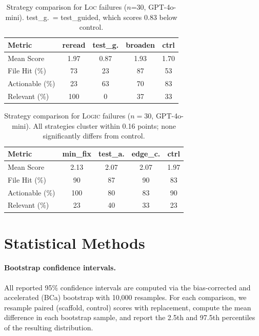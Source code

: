 \documentclass[11pt]{article}
\begin{document}
\begin{table}[t]
\centering
\small
\setlength{\tabcolsep}{3pt}
\begin{tabular}{@{}lcccc@{}}
\toprule
\textbf{Metric} & \textbf{reread} & \textbf{test\_g.} & \textbf{broaden} & \textbf{ctrl} \\
\midrule
Mean Score & 1.97 & 0.87 & 1.93 & 1.70 \\
File Hit (\%) & 73 & 23 & 87 & 53 \\
Actionable (\%) & 23 & 63 & 70 & 83 \\
Relevant (\%) & 100 & 0 & 37 & 33 \\
\bottomrule
\end{tabular}
\caption{Strategy comparison for \textsc{Loc} failures ($n$=30, GPT-4o-mini). test\_g.\ = test\_guided, which scores 0.83 below control.}
\label{tab:per-instance-loc}
\end{table}

\begin{table}[t]
\centering
\small
\setlength{\tabcolsep}{3pt}
\begin{tabular}{@{}lcccc@{}}
\toprule
\textbf{Metric} & \textbf{min\_fix} & \textbf{test\_a.} & \textbf{edge\_c.} & \textbf{ctrl} \\
\midrule
Mean Score & 2.13 & 2.07 & 2.07 & 1.97 \\
File Hit (\%) & 90 & 87 & 90 & 83 \\
Actionable (\%) & 100 & 80 & 83 & 90 \\
Relevant (\%) & 23 & 40 & 33 & 23 \\
\bottomrule
\end{tabular}
\caption{Strategy comparison for \textsc{Logic} failures ($n=30$, GPT-4o-mini). All strategies cluster within 0.16 points; none significantly differs from control.}
\label{tab:per-instance-logic}
\end{table}


\section{Statistical Methods}
\label{app:stats}

\paragraph{Bootstrap confidence intervals.}
All reported 95\% confidence intervals are computed via the bias-corrected and accelerated (BCa) bootstrap with 10,000 resamples.
For each comparison, we resample paired (scaffold, control) scores with replacement, compute the mean difference in each bootstrap sample, and report the 2.5th and 97.5th percentiles of the resulting distribution.
\end{document}
